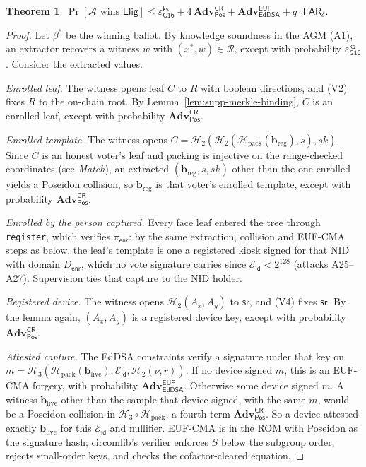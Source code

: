 \documentclass[10pt,letterpaper,journal]{IEEEtran}
\newtheorem{theorem}{Theorem}[section]
\begin{document}
\begin{theorem}
\label{thm:supp-eligibility}
$\Pr[\mathcal{A} \text{ wins } \mathsf{Elig}] \leq \varepsilon^{\mathsf{ks}}_{\mathsf{G16}} + 4\,\mathbf{Adv}^{\mathsf{CR}}_{\mathsf{Pos}} + \mathbf{Adv}^{\mathsf{EUF}}_{\mathsf{EdDSA}} + q \cdot \mathsf{FAR}_\delta$.
\end{theorem}

\begin{proof}
Let $\beta^\ast$ be the winning ballot. By knowledge soundness in the AGM (A1), an extractor recovers a witness $w$ with $(x^\ast, w) \in \mathcal{R}$, except with probability $\varepsilon^{\mathsf{ks}}_{\mathsf{G16}}$. Consider the extracted values.

\emph{Enrolled leaf.} The witness opens leaf $C$ to $R$ with boolean directions, and (V2) fixes $R$ to the on-chain root. By Lemma~\ref{lem:supp-merkle-binding}, $C$ is an enrolled leaf, except with probability $\mathbf{Adv}^{\mathsf{CR}}_{\mathsf{Pos}}$.

\emph{Enrolled template.} The witness opens $C = \mathcal{H}_2(\mathcal{H}_2(\mathcal{H}_{\text{pack}}(\mathbf{b}_{\text{reg}}), s), sk)$. Since $C$ is an honest voter's leaf and packing is injective on the range-checked coordinates (see \emph{Match}), an extracted $(\mathbf{b}_{\text{reg}}, s, sk)$ other than the one enrolled yields a Poseidon collision, so $\mathbf{b}_{\text{reg}}$ is that voter's enrolled template, except with probability $\mathbf{Adv}^{\mathsf{CR}}_{\mathsf{Pos}}$.

\emph{Enrolled by the person captured.} Every face leaf entered the tree through \texttt{register}, which verifies $\pi_{\mathsf{enr}}$: by the same extraction, collision and EUF-CMA steps as below, the leaf's template is one a registered kiosk signed for that NID with domain $D_{\mathsf{enr}}$, which no vote signature carries since $\mathcal{E}_{\mathsf{id}} < 2^{128}$ (attacks A25--A27). Supervision ties that capture to the NID holder.

\emph{Registered device.} The witness opens $\mathcal{H}_2(A_x, A_y)$ to $\mathsf{sr}$, and (V4) fixes $\mathsf{sr}$. By the lemma again, $(A_x, A_y)$ is a registered device key, except with probability $\mathbf{Adv}^{\mathsf{CR}}_{\mathsf{Pos}}$.

\emph{Attested capture.} The EdDSA constraints verify a signature under that key on $m = \mathcal{H}_3(\mathcal{H}_{\text{pack}}(\mathbf{b}_{\text{live}}), \mathcal{E}_{\mathsf{id}}, \mathcal{H}_2(\nu, r))$. If no device signed $m$, this is an EUF-CMA forgery, with probability $\mathbf{Adv}^{\mathsf{EUF}}_{\mathsf{EdDSA}}$. Otherwise some device signed $m$. A witness $\mathbf{b}_{\text{live}}$ other than the sample that device signed, with the same $m$, would be a Poseidon collision in $\mathcal{H}_3 \circ \mathcal{H}_{\text{pack}}$, a fourth term $\mathbf{Adv}^{\mathsf{CR}}_{\mathsf{Pos}}$. So a device attested exactly $\mathbf{b}_{\text{live}}$ for this $\mathcal{E}_{\mathsf{id}}$ and nullifier. EUF-CMA is in the ROM with Poseidon as the signature hash; circomlib's verifier enforces $S$ below the subgroup order, rejects small-order keys, and checks the cofactor-cleared equation.


\end{proof}
\end{document}
